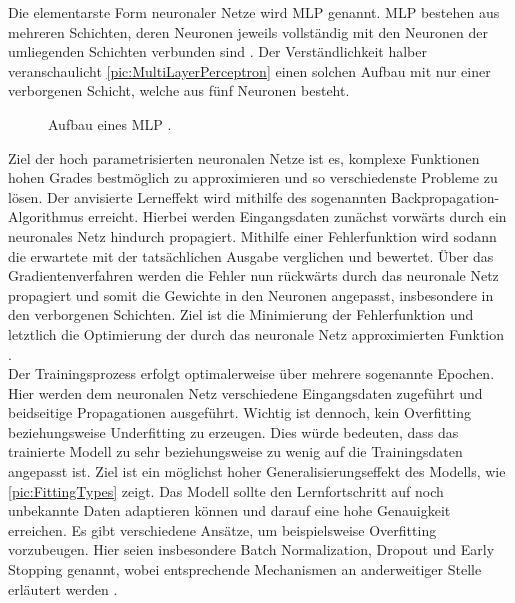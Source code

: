 \noindent
Die elementarste Form neuronaler Netze wird \ac{MLP} genannt. \ac{MLP} bestehen aus mehreren Schichten, deren Neuronen jeweils vollständig mit den Neuronen der umliegenden Schichten verbunden sind \cite[S.~131]{ZHA20}. Der Verständlichkeit halber veranschaulicht \autoref{pic:MultiLayerPerceptron} einen solchen Aufbau mit nur einer verborgenen Schicht, welche aus fünf Neuronen besteht.

\begin{figure}[h!]
  \centering
  \caption{Aufbau eines MLP \cite[S.~133]{ZHA20}.}
  \label{pic:MultiLayerPerceptron}
\end{figure}

\noindent
Ziel der hoch parametrisierten neuronalen Netze ist es, komplexe Funktionen hohen Grades bestmöglich zu approximieren und so verschiedenste Probleme zu lösen. Der anvisierte Lerneffekt wird mithilfe des sogenannten Backpropagation-Algorithmus erreicht. Hierbei werden Eingangsdaten zunächst vorwärts durch ein neuronales Netz hindurch propagiert. Mithilfe einer Fehlerfunktion wird sodann die erwartete mit der tatsächlichen Ausgabe verglichen und bewertet. Über das Gradientenverfahren werden die Fehler nun rückwärts durch das neuronale Netz propagiert und somit die Gewichte in den Neuronen angepasst, insbesondere in den verborgenen Schichten. Ziel ist die Minimierung der Fehlerfunktion und letztlich die Optimierung der durch das neuronale Netz approximierten Funktion \cite[S.~140, 169]{ZHA20}.\\

\noindent
Der Trainingsprozess erfolgt optimalerweise über mehrere sogenannte Epochen. Hier werden dem neuronalen Netz verschiedene Eingangsdaten zugeführt und beidseitige Propagationen ausgeführt. Wichtig ist dennoch, kein Overfitting beziehungsweise Underfitting zu erzeugen. Dies würde bedeuten, dass das trainierte Modell zu sehr beziehungsweise zu wenig auf die Trainingsdaten angepasst ist. Ziel ist ein möglichst hoher Generalisierungseffekt des Modells, wie \autoref{pic:FittingTypes} zeigt. Das Modell sollte den Lernfortschritt auf noch unbekannte Daten adaptieren können und darauf eine hohe Genauigkeit erreichen. Es gibt verschiedene Ansätze, um beispielsweise Overfitting vorzubeugen. Hier seien insbesondere Batch Normalization, Dropout und Early Stopping genannt, wobei entsprechende Mechanismen an anderweitiger Stelle erläutert werden \cite[S.~143-149]{ZHA20}.

